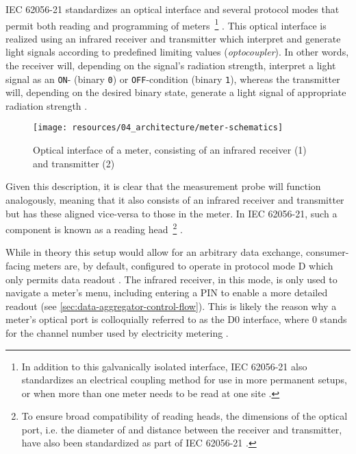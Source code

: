\acs{IEC} 62056-21 standardizes an optical interface and several protocol modes that permit both reading and programming of meters~\footnote{In addition to this galvanically isolated interface, \acs{IEC} 62056-21 also standardizes an electrical coupling method for use in more permanent setups, or when more than one meter needs to be read at one site \cite[p.~15]{iec2002d0}.} \cite[p.~15]{iec2002d0}. This optical interface is realized using an infrared receiver and transmitter which interpret and generate light signals according to predefined limiting values (\textit{optocoupler}). In other words, the receiver will, depending on the signal's radiation strength, interpret a light signal as an \texttt{ON}- (binary \texttt{0}) or \texttt{OFF}-condition (binary \texttt{1}), whereas the transmitter will, depending on the desired binary state, generate a light signal of appropriate radiation strength \cite[pp.~30--31]{iec2002d0}.

\begin{figure}[hbt]
  \centering
  \texttt{[image: resources/04\_architecture/meter-schematics]}
  \caption[Optical interface of a meter]{Optical interface of a meter, consisting of an infrared receiver (1) and transmitter (2) \cite[p.~7]{nzr2011ehz}}
  \label{fig:meter-schematics}
\end{figure}

\FloatBarrier

Given this description, it is clear that the measurement probe will function analogously, meaning that it also consists of an infrared receiver and transmitter but has these aligned vice-versa to those in the meter. In \acs{IEC} 62056-21, such a component is known as a reading head~\footnote{To ensure broad compatibility of reading heads, the dimensions of the optical port, i.e. the diameter of and distance between the receiver and transmitter, have also been standardized as part of \acs{IEC} 62056-21 \cite[p.~25]{iec2002d0}.} \cite[p.~29]{iec2002d0}.

While in theory this setup would allow for an arbitrary data exchange, consumer-facing meters are, by default, configured to operate in protocol mode D which only permits data readout \cite[p.~7]{nzr2011ehz} \cite[p.~35]{iec2002d0}. The infrared receiver, in this mode, is only used to navigate a meter's menu, including entering a \acs{PIN} to enable a more detailed readout (see \autoref{sec:data-aggregator-control-flow}). This is likely the reason why a meter's optical port is colloquially referred to as the D0 interface, where 0 stands for the channel number used by electricity metering \cite[p.~119]{iec2002d0}.


